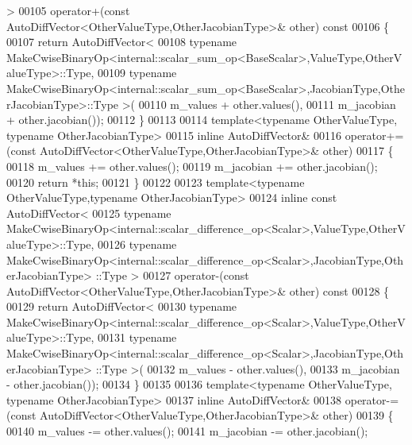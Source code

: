 \begin{DoxyCode}
      >
00105     operator+(\textcolor{keyword}{const} AutoDiffVector<OtherValueType,OtherJacobianType>& other)\textcolor{keyword}{ const}
00106 \textcolor{keyword}{    }\{
00107       \textcolor{keywordflow}{return} AutoDiffVector<
00108       \textcolor{keyword}{typename} MakeCwiseBinaryOp<internal::scalar\_sum\_op<BaseScalar>,ValueType,OtherValueType>::Type,
00109       \textcolor{keyword}{typename} MakeCwiseBinaryOp<internal::scalar\_sum\_op<BaseScalar>,JacobianType,OtherJacobianType>::Type 
      >(
00110         m\_values + other.values(),
00111         m\_jacobian + other.jacobian());
00112     \}
00113 
00114     \textcolor{keyword}{template}<\textcolor{keyword}{typename} OtherValueType, \textcolor{keyword}{typename} OtherJacobianType>
00115     \textcolor{keyword}{inline} AutoDiffVector&
00116     operator+=(\textcolor{keyword}{const} AutoDiffVector<OtherValueType,OtherJacobianType>& other)
00117     \{
00118       m\_values += other.values();
00119       m\_jacobian += other.jacobian();
00120       \textcolor{keywordflow}{return} *\textcolor{keyword}{this};
00121     \}
00122 
00123     \textcolor{keyword}{template}<\textcolor{keyword}{typename} OtherValueType,\textcolor{keyword}{typename} OtherJacobianType>
00124     \textcolor{keyword}{inline} \textcolor{keyword}{const} AutoDiffVector<
00125       \textcolor{keyword}{typename} MakeCwiseBinaryOp<internal::scalar\_difference\_op<Scalar>,ValueType,OtherValueType>::Type,
00126       \textcolor{keyword}{typename} MakeCwiseBinaryOp<internal::scalar\_difference\_op<Scalar>,JacobianType,OtherJacobianType>
      ::Type >
00127     operator-(\textcolor{keyword}{const} AutoDiffVector<OtherValueType,OtherJacobianType>& other)\textcolor{keyword}{ const}
00128 \textcolor{keyword}{    }\{
00129       \textcolor{keywordflow}{return} AutoDiffVector<
00130         \textcolor{keyword}{typename} MakeCwiseBinaryOp<internal::scalar\_difference\_op<Scalar>,ValueType,OtherValueType>::Type,
00131         \textcolor{keyword}{typename} MakeCwiseBinaryOp<internal::scalar\_difference\_op<Scalar>,JacobianType,OtherJacobianType>
      ::Type >(
00132           m\_values - other.values(),
00133           m\_jacobian - other.jacobian());
00134     \}
00135 
00136     \textcolor{keyword}{template}<\textcolor{keyword}{typename} OtherValueType, \textcolor{keyword}{typename} OtherJacobianType>
00137     \textcolor{keyword}{inline} AutoDiffVector&
00138     operator-=(\textcolor{keyword}{const} AutoDiffVector<OtherValueType,OtherJacobianType>& other)
00139     \{
00140       m\_values -= other.values();
00141       m\_jacobian -= other.jacobian();

\end{DoxyCode}
